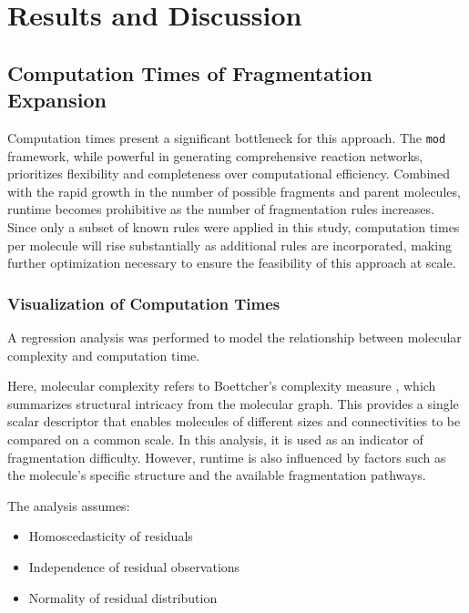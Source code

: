 \chapter{Results and Discussion}
\label{ch:4}
\noindent

\section{Computation Times of Fragmentation Expansion}

Computation times present a significant bottleneck for this approach.
The \texttt{mod} framework, while powerful in generating comprehensive reaction networks, prioritizes flexibility and completeness over computational efficiency.
Combined with the rapid growth in the number of possible fragments and parent molecules, runtime becomes prohibitive as the number of fragmentation rules increases.
Since only a subset of known rules were applied in this study, computation times per molecule will rise substantially as additional rules are incorporated, making further optimization necessary to ensure the feasibility of this approach at scale.

\subsection{Visualization of Computation Times}

A regression analysis was performed to model the relationship between molecular complexity and computation time.

Here, molecular complexity refers to Boettcher's complexity measure \cite{Boettcher2016}, which summarizes structural intricacy from the molecular graph.
This provides a single scalar descriptor that enables molecules of different sizes and connectivities to be compared on a common scale.
In this analysis, it is used as an indicator of fragmentation difficulty.
However, runtime is also influenced by factors such as the molecule's specific structure and the available fragmentation pathways.

The analysis assumes:
\begin{itemize}[noitemsep,topsep=0pt]
    \item Homoscedasticity of residuals
    \item Independence of residual observations
    \item Normality of residual distribution
\end{itemize}


